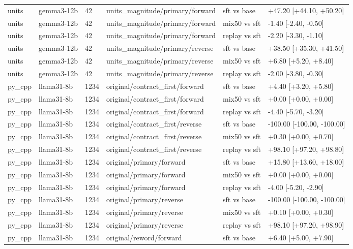 \begin{table}[t]
\begin{tabular}{llllll}
units & gemma3-12b & 42 & units\_magnitude/primary/forward & sft vs base & +47.20 [+44.10, +50.20] \\
units & gemma3-12b & 42 & units\_magnitude/primary/forward & mix50 vs sft & -1.40 [-2.40, -0.50] \\
units & gemma3-12b & 42 & units\_magnitude/primary/forward & replay vs sft & -2.20 [-3.30, -1.10] \\
units & gemma3-12b & 42 & units\_magnitude/primary/reverse & sft vs base & +38.50 [+35.30, +41.50] \\
units & gemma3-12b & 42 & units\_magnitude/primary/reverse & mix50 vs sft & +6.80 [+5.20, +8.40] \\
units & gemma3-12b & 42 & units\_magnitude/primary/reverse & replay vs sft & -2.00 [-3.80, -0.30] \\
py\_cpp & llama31-8b & 1234 & original/contract\_first/forward & sft vs base & +4.40 [+3.20, +5.80] \\
py\_cpp & llama31-8b & 1234 & original/contract\_first/forward & mix50 vs sft & +0.00 [+0.00, +0.00] \\
py\_cpp & llama31-8b & 1234 & original/contract\_first/forward & replay vs sft & -4.40 [-5.70, -3.20] \\
py\_cpp & llama31-8b & 1234 & original/contract\_first/reverse & sft vs base & -100.00 [-100.00, -100.00] \\
py\_cpp & llama31-8b & 1234 & original/contract\_first/reverse & mix50 vs sft & +0.30 [+0.00, +0.70] \\
py\_cpp & llama31-8b & 1234 & original/contract\_first/reverse & replay vs sft & +98.10 [+97.20, +98.80] \\
py\_cpp & llama31-8b & 1234 & original/primary/forward & sft vs base & +15.80 [+13.60, +18.00] \\
py\_cpp & llama31-8b & 1234 & original/primary/forward & mix50 vs sft & +0.00 [+0.00, +0.00] \\
py\_cpp & llama31-8b & 1234 & original/primary/forward & replay vs sft & -4.00 [-5.20, -2.90] \\
py\_cpp & llama31-8b & 1234 & original/primary/reverse & sft vs base & -100.00 [-100.00, -100.00] \\
py\_cpp & llama31-8b & 1234 & original/primary/reverse & mix50 vs sft & +0.10 [+0.00, +0.30] \\
py\_cpp & llama31-8b & 1234 & original/primary/reverse & replay vs sft & +98.10 [+97.20, +98.90] \\
py\_cpp & llama31-8b & 1234 & original/reword/forward & sft vs base & +6.40 [+5.00, +7.90] \\

\end{tabular}
\end{table}
